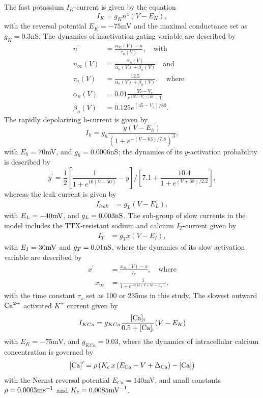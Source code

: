 \documentclass[nofootinbib,aip,amsmath,amssymb,preprint,twocolumn,floatfix,10pt]{revtex4-2}
\begin{document}
  The fast potassium $I_K$-current is given by the equation  
\begin{equation}
I_K=g_{K} n^{4}(V-E_{K}),  
\end{equation}
with the reversal potential $E_{K}=-75$mV and the maximal conductance set as $g_K=0.3$nS. The dynamics of inactivation gating variable are described by 
\begin{align}
{n}^\prime &= \frac{n_{\infty}(V)-n}{\tau_{n}(V)}, \quad \mbox{with} \quad \\
n_{\infty}(V) &= \frac{\alpha_{n}(V)}{\alpha_{n}(V) +\beta_{n}(V)} \quad \mbox{and} \quad \\
\tau_{n}(V) &= \frac{12.5}{\alpha_{n}(V) +\beta_{n}(V)}, \quad \mbox{where} \quad \\
\alpha_{n}(V) &= 0.01 \frac{55-V_s}{e^{(55-V_s)/10}-1} \quad \mbox{} \quad \\
\beta_{n}(V) &= 0.125 e^{(45-V_s)/80}.
\end{align}	
The rapidly depolarizing h-current is given by 
\begin{equation}
I_{h}=g_{h} \frac{y (V-E_{h})}{(1+e^{-(V-63)/7.8})^3}, 
\end{equation}
with $E_{h}=70$mV, and $g_h=0.0006$nS; the dynamics of its $y$-activation probability is described by 
 \begin{equation}
{y}^\prime = \frac{1}{2} \left [ \frac{1}{1+e^{10(V-50)}}-y \right ]/ \left [ 7.1+\frac{10.4}{1+e^{(V+68)/2.2}} \right ], 
\end{equation}	
whereas the leak current is given by 
\begin{align}
I_{leak} &=g_{L} (V-E_{L}), 
\end{align}
with $E_{L} =-40{\rm mV}$, and $g_{L}=0.003{\rm nS}$. The sub-group of slow currents in the model includes the TTX-resistant sodium and calcium $I_{T}$-current given by   \begin{align}
 I_{T} &= g_{T} x (V-E_{I}),
\end{align}
with $E_{I} =30{\rm mV}$ and $g_{T}=0.01{\rm nS}$, where the dynamics of its slow activation variable are described by  
 \begin{align}
{x}^\prime &= \frac{x_{\infty}(V)-x}{\tau_{x}}, \quad \mbox{where} \\ 
\quad x_{\infty} &= \frac{1}{1+e^{-0.15(V+50-\Delta_x)}},
\end{align}\label{eqttx} 
with the time constant $\tau_{x}$ set as 100 or 235ms in this study. The slowest outward ${\rm Ca}^{2+}$ activated $K^+$ current given by  
\begin{equation}
I_{KCa} =g_{KCa}\frac{[\rm Ca]_i}{0.5+[\rm Ca]_i}(V-E_{K})
 \label{IKCa}
\end{equation}
with  $E_{K}=-75\mbox{mV}$, and $g_{KCa}=0.03$, where the dynamics of intracellular calcium concentration is governed by 
\begin{equation}
{[\rm Ca]}^\prime  =  \rho \left ( K_{c}\, x\, (E_{\rm Ca}-V + \Delta_{\rm Ca})-[\rm Ca] \right  )  \label{eqCa}
\end{equation}
with the Nernst reversal potential  $E_{Ca}=140$mV, and small constants $\rho= 0.0003{\rm ms}^{-1}$ and  $K_c=0.0085{\rm mV}^{-1}$.
\end{document}
